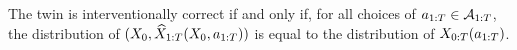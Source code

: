 
\begin{proposition} \label{prop:interventional-correctness-alternative-characterisation}
    The twin is interventionally correct if and only if, for all choices of $a_{1:T} \in \mathcal{A}_{1:T}$, the distribution of $(X_0, \widehat{X}_{1:T}(X_0, a_{1:T}))$ is equal to the distribution of $X_{0:T}(a_{1:T})$.
\end{proposition}



